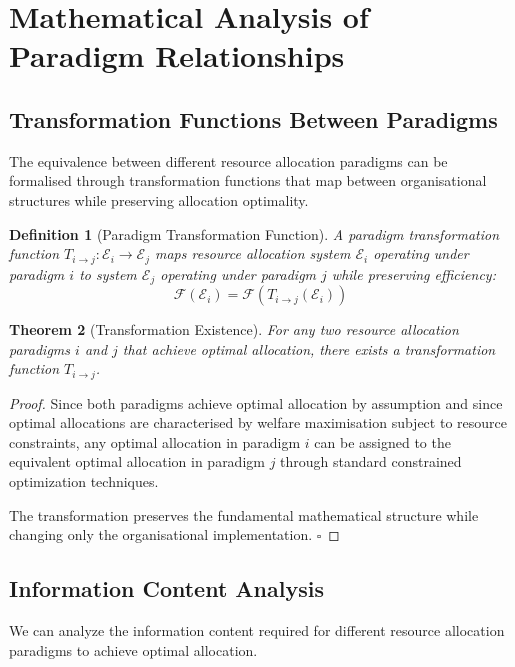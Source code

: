 \documentclass[12pt,a4paper]{article}
\newtheorem{theorem}{Theorem}
\newtheorem{definition}[theorem]{Definition}
\begin{document}
\section{Mathematical Analysis of Paradigm Relationships}

\subsection{Transformation Functions Between Paradigms}

The equivalence between different resource allocation paradigms can be formalised through transformation functions that map between organisational structures while preserving allocation optimality.

\begin{definition}[Paradigm Transformation Function]
A paradigm transformation function $T_{i \to j} : \mathcal{E}_i \to \mathcal{E}_j$ maps resource allocation system $\mathcal{E}_i$ operating under paradigm $i$ to system $\mathcal{E}_j$ operating under paradigm $j$ while preserving efficiency:
\begin{equation}
\mathcal{F}(\mathcal{E}_i) = \mathcal{F}(T_{i \to j}(\mathcal{E}_i))
\end{equation}
\end{definition}

\begin{theorem}[Transformation Existence]
For any two resource allocation paradigms $i$ and $j$ that achieve optimal allocation, there exists a transformation function $T_{i \to j}$.
\end{theorem}

\begin{proof}
Since both paradigms achieve optimal allocation by assumption and since optimal allocations are characterised by welfare maximisation subject to resource constraints, any optimal allocation in paradigm $i$ can be assigned to the equivalent optimal allocation in paradigm $j$ through standard constrained optimization techniques.

The transformation preserves the fundamental mathematical structure while changing only the organisational implementation. $\square$
\end{proof}

\subsection{Information Content Analysis}

We can analyze the information content required for different resource allocation paradigms to achieve optimal allocation.
\end{document}
